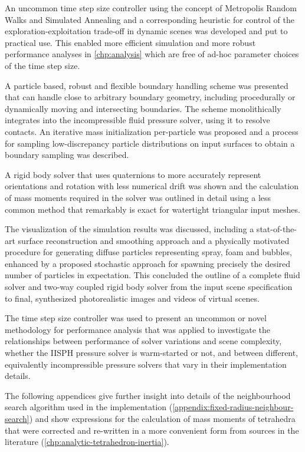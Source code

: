 \documentclass[oneside, a4paper]{book}
\begin{document}
  An uncommon time step size controller using the concept of Metropolis Random Walks and Simulated Annealing and a corresponding heuristic for control of the exploration-exploitation trade-off in dynamic scenes was developed and put to practical use. This enabled more efficient simulation and more robust performance analyses in \autoref{chp:analysis} which are free of ad-hoc parameter choices of the time step size. 

  A particle based, robust and flexible boundary handling scheme was presented that can handle close to arbitrary boundary geometry, including procedurally or dynamically moving and intersecting boundaries. The scheme monolithically integrates into the incompressible fluid pressure solver, using it to resolve contacts. An iterative mass initialization per-particle was proposed and a process for sampling low-discrepancy particle distributions on input surfaces to obtain a boundary sampling was described.
  
  A rigid body solver that uses quaternions to more accurately represent orientations and rotation with less numerical drift was shown and the calculation of mass moments required in the solver was outlined in detail using a less common method that remarkably is exact for watertight triangular input meshes. 

  The visualization of the simulation results was discussed, including a stat-of-the-art surface reconstruction and smoothing approach and a physically motivated procedure for generating diffuse particles representing spray, foam and bubbles, enhanced by a proposed stochastic approach for spawning precisely the desired number of particles in expectation. This concluded the outline of a complete fluid solver and two-way coupled rigid body solver from the input scene specification to final, synthesized photorealistic images and videos of virtual scenes.

  The time step size controller was used to present an uncommon or novel methodology for performance analysis that was applied to investigate the relationships between performance of solver variations and scene complexity, whether the IISPH pressure solver is warm-started or not, and between different, equivalently incompressible pressure solvers that vary in their implementation details. 

  The following appendices give further insight into details of the neighbourhood search algorithm used in the implementation (\autoref{appendix:fixed-radius-neighbour-search}) and show expressions for the calculation of mass moments of tetrahedra that were corrected and re-written in a more convenient form from sources in the literature (\autoref{chp:analytic-tetrahedron-inertia}).
\end{document}
